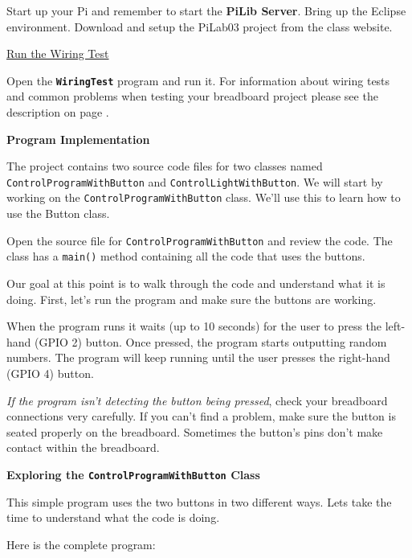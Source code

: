 \vspace{10pt}

Start up your Pi and remember to start the \textbf{PiLib Server}. Bring up the Eclipse environment. Download and setup the PiLab03 project from the class website.

\underline{Run the Wiring Test}

Open the \textbf{\texttt{WiringTest}} program and run it. For information about wiring tests and common problems when testing your breadboard project please see the description on page \pageref{wiringTestDescription}.

\textbf{Program Implementation}

The project contains two source code files for two classes named \texttt{ControlProgramWithButton} and \texttt{ControlLightWithButton}. We will start by working on the \texttt{ControlProgramWithButton} class. We'll use this to learn how to use the Button class.

Open the source file for \texttt{ControlProgramWithButton} and review the code. The class has a \texttt{main()} method containing all the code that uses the buttons.

Our goal at this point is to walk through the code and understand what it is doing. First, let's run the program and make sure the buttons are working.

When the program runs it waits (up to 10 seconds) for the user to press the left-hand (GPIO 2) button. Once pressed, the program starts outputting random numbers. The program will keep running until the user presses the right-hand (GPIO 4) button. 

\textit{If the program isn't detecting the button being pressed}, check your breadboard connections very carefully. If you can't find a problem, make sure the button is seated properly on the breadboard. Sometimes the button's pins don't make contact within the breadboard.

\textbf{Exploring the \texttt{ControlProgramWithButton} Class}

This simple program uses the two buttons in two different ways. Lets take the time to understand what the code is doing.

Here is the complete program:

